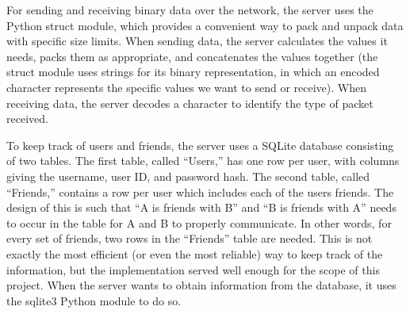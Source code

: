 For sending and receiving binary data over the network, the server uses the Python struct
module, which provides a convenient way to pack and unpack data with specific size
limits. When sending data, the server calculates the values it needs, packs them as
appropriate, and concatenates the values together (the struct module uses strings
for its binary representation, in which an encoded character represents the specific values
we want to send or receive). When receiving data, the server decodes a character
to identify the type of packet received.

To keep track of users and friends, the server uses a SQLite database consisting of
two tables. The first table, called ``Users,'' has one row per user, with columns
giving the username, user ID, and password hash. The second table, called ``Friends,''
contains a row per user which includes each of the users friends. The design of this is such
that ``A is friends with B'' and ``B is friends with A'' needs to occur in the table
for A and B to properly communicate. In other words, for every set of friends, two rows
in the ``Friends'' table are needed. This is not exactly the most efficient (or even the
most reliable) way to keep track of the information, but the implementation served well enough
for the scope of this project. When the server wants to obtain information from the
database, it uses the sqlite3 Python module to do so. 

